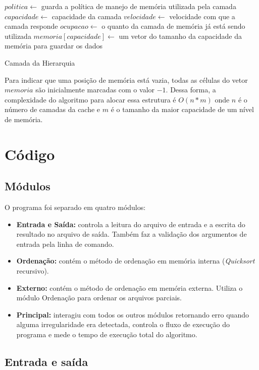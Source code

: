 \documentclass[12pt]{article}
\begin{document}
\begin{algorithm}[h!]
\begin{footnotesize}
$politica\longleftarrow$ guarda a política de manejo de memória utilizada pela camada\;
$capacidade\longleftarrow$ capacidade da camada\;
$velocidade\longleftarrow$ velocidade com que a camada responde\;
$ocupacao\longleftarrow$ o quanto da camada de memória já está sendo utilizada\;
$memoria[capacidade]\longleftarrow$ um vetor do tamanho da capacidade da memória para guardar os dados\;
\caption{Camada da Hierarquia}
\end{footnotesize}
\end{algorithm}

Para indicar que uma posição de memória está vazia, todas as células do vetor $memoria$ são inicialmente marcadas com o valor
$-1$. Dessa forma, a complexidade do algoritmo para alocar essa estrutura é $O(n * m)$ onde $n$ é o número de camadas da cache
e $m$ é o tamanho da maior capacidade de um nível de memória.

\section{Código}

\subsection{Módulos}
O programa foi separado em quatro módulos:
\begin{itemize}
\item \textbf{Entrada e Saída:} controla a leitura do arquivo de entrada
e a escrita do resultado no arquivo de saída. Também faz a validação dos 
argumentos de entrada pela linha de comando.
\item \textbf{Ordenação:} contém o método de ordenação em memória interna 
(\textit{Quicksort} recursivo).
\item \textbf{Externo:} contém o método de ordenação em memória externa. Utiliza
o módulo Ordenação para ordenar os arquivos parciais.
\item \textbf{Principal:} interagiu com todos os outros módulos retornando erro
quando alguma irregularidade era detectada, controla o fluxo de execução do
programa e mede o tempo de execução total do algoritmo.
\end{itemize}

\subsection{Entrada e saída}
\end{document}
